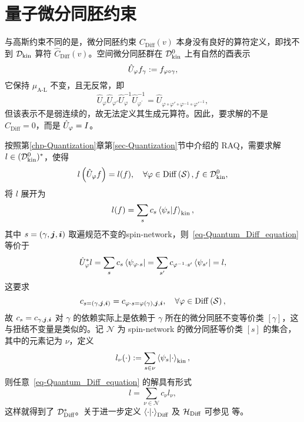 
	\section{量子微分同胚约束}

		与高斯约束不同的是，微分同胚约束 $C_{\text{Diff}}(v)$ 本身没有良好的算符定义，即找不到 $\mathcal{D}_{\text{kin}}$ 算符 $\hat{C}_{\text{Diff}}(v)$。空间微分同胚群在 $\mathcal{D}_{\text{kin}}^0$ 上有自然的酉表示
		\begin{equation}
			\hat{U}_{\varphi} f_\gamma := f_{\varphi \circ \gamma},
		\end{equation}
		它保持 $\mu_{\text{A-L}}$ 不变，且无反常，即
		\begin{equation}
			\hat{U}_{\varphi} \hat{U}_{\varphi'} \hat{U}_{\varphi}^{-1} \hat{U}_{\varphi^{\prime}}^{-1} = \hat{U}_{\varphi \circ \varphi' \circ \varphi^{-1} \circ {\varphi'}^{-1}},
		\end{equation}
		但该表示不是弱连续的，故无法定义其生成元算符。因此，要求解的不是 $\hat{C}_{\text{Diff}} = 0$，而是 $\hat{U}_{\varphi} = I$。

		按照第\ref{chp-Quantization}章第\ref{sec-Quantization}节中介绍的 RAQ，需要求解 $l\in (\mathcal{D}_{\text{kin}}^0)^*$，使得
		\begin{equation}
			l\left(\hat{U}_\varphi f\right) = l(f) \qc \forall \varphi \in \Diff{\spc}, f\in \Dkin^0,\label{eq-Quantum_Diff_equation}
		\end{equation}
		将 $l$ 展开为
		\begin{equation}
			l(f) = \sum_{s} c_s \ip{\psi_s}{f}_{\text{kin}},
		\end{equation}
		其中 $s=(\gamma,\vb*{j},\vb*{i})$ 取遍规范不变的spin-network，则~\eqref{eq-Quantum_Diff_equation} 等价于
		\begin{equation}
			\hat{U}^*_{\varphi}l = \sum_s c_s \bra{\psi_{\varphi \cdot s}} = \sum_{s'} c_{\varphi^{-1} \cdot s'} \bra{\psi_{s'}} = l,
		\end{equation}
		这要求
		\begin{equation}
			c_{s=(\gamma,\myvec{j},\myvec{i})} = c_{\varphi \cdot s = \varphi(\gamma),\myvec{j},\myvec{i}}\qc \forall \varphi \in \Diff{\spc},
		\end{equation}
		故 $c_s = c_{\gamma,\vb*{j},\vb*{i}}$ 对 $\gamma$ 的依赖实际上是依赖于 $\gamma$ 所在的微分同胚不变等价类 $[\gamma]$，这与扭结不变量是类似的。记 $\mathcal{N}$ 为 spin-network 的微分同胚等价类 $[s]$ 的集合，其中的元素记为 $\nu$，定义
		\begin{equation}
			l_{\nu}(\cdot) \definedby \sum_{s\in \nu} \ip{\psi_s}{\cdot}_{\text{kin}},
		\end{equation}
		则任意~\eqref{eq-Quantum_Diff_equation} 的解具有形式
		\begin{equation}
			l = \sum_{\nu \in \mathcal{N}} c_\nu l_\nu,
		\end{equation}
		这样就得到了 $\mathcal{D}_{\text{Diff}}^*$。关于进一步定义 $\ip{\cdot}_{\text{Diff}}$ 及 $\mathcal{H}_{\text{Diff}}$ 可参见 \cite{Han2005,Thiemann2007} 等。

